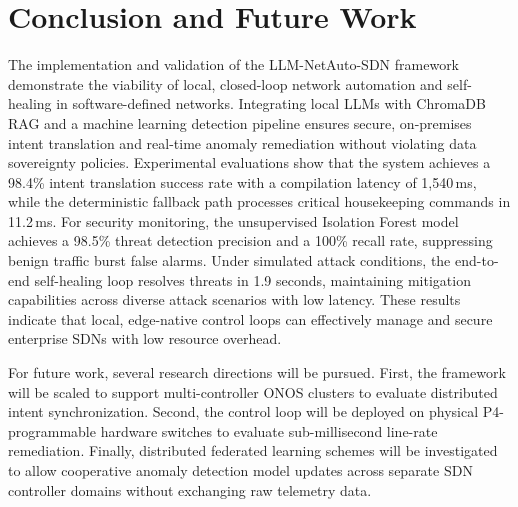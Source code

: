 \documentclass[conference]{IEEEtran}
\begin{document}
\section{Conclusion and Future Work}
The implementation and validation of the LLM-NetAuto-SDN framework demonstrate the viability of local, closed-loop network automation and self-healing in software-defined networks. Integrating local LLMs with ChromaDB RAG and a machine learning detection pipeline ensures secure, on-premises intent translation and real-time anomaly remediation without violating data sovereignty policies. Experimental evaluations show that the system achieves a 98.4\% intent translation success rate with a compilation latency of 1,540\,ms, while the deterministic fallback path processes critical housekeeping commands in 11.2\,ms. For security monitoring, the unsupervised Isolation Forest model achieves a 98.5\% threat detection precision and a 100\% recall rate, suppressing benign traffic burst false alarms. Under simulated attack conditions, the end-to-end self-healing loop resolves threats in 1.9 seconds, maintaining mitigation capabilities across diverse attack scenarios with low latency. These results indicate that local, edge-native control loops can effectively manage and secure enterprise SDNs with low resource overhead.

For future work, several research directions will be pursued. First, the framework will be scaled to support multi-controller ONOS clusters to evaluate distributed intent synchronization. Second, the control loop will be deployed on physical P4-programmable hardware switches to evaluate sub-millisecond line-rate remediation. Finally, distributed federated learning schemes will be investigated to allow cooperative anomaly detection model updates across separate SDN controller domains without exchanging raw telemetry data.
\end{document}
